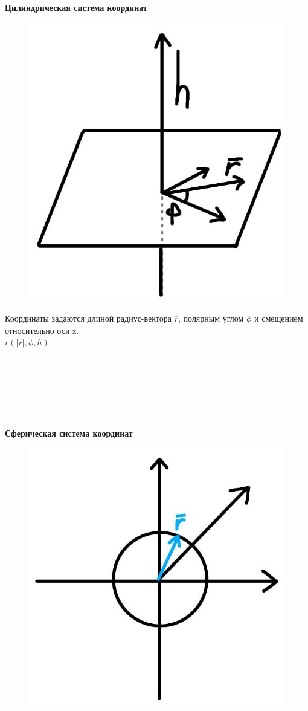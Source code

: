 \textbf{Цилиндрическая система координат}\\
\begin{figure}
	\includegraphics[width=0.6\linewidth]{images/цилиндрическаяск.jpeg}
\end{figure}

Координаты задаются длиной радиус-вектора $\overline{r}$, полярным углом $\phi$ и смещением относительно оси z.\\

$\overline{r}(|\overline{r}|, \phi, h)$

\tab\\ \tab\\ \tab\\ \tab\\ \tab\\ \tab\\
\textbf{Сферическая система координат}\\
\begin{figure}
	\includegraphics[width=0.5\linewidth]{images/сферическая.jpeg}
\end{figure}

